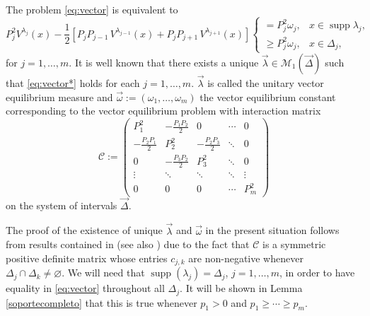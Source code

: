 \documentclass{amsart}
\numberwithin{equation}{section}
\theoremstyle{definition}
\DeclareMathOperator{\supp}{supp}  %
\begin{document}
    The problem \eqref{eq:vector} is equivalent to
    \begin{equation}
    	\label{eq:vector*}
    	P_j^2 V^{\lambda_j}(x) - \frac{1}{2}\left[ P_jP_{j-1}\,V^{\lambda_{j-1}}(x) +  P_jP_{j+1}\,V^{\lambda_{j+1}}(x)\right]
        \begin{cases}
    	    =  P_j^2\omega_j, & x\in\supp \lambda_j,\\
    	  \geq P_j^2\omega_j, & x\in \Delta_j,
        \end{cases}
    \end{equation}
    for $j=1,\ldots,m$. It is well known that there exists a unique $\vec{\lambda} \in \mathcal{M}_1(\vec{\Delta})$ such that \eqref{eq:vector*} holds for each $j=1,\ldots,m$.      $\vec{\lambda}$ is called the unitary vector equilibrium measure and $\vec{\omega} := (\omega_1,\ldots,\omega_m)$ the vector equilibrium constant corresponding to the vector equilibrium problem with interaction matrix
    \begin{equation}
        \label{interaction}
        \mathcal{C} := \left(
        \begin{array}{ccccc}
            P_1^2 & -\frac{P_1 P_2}{2} & 0 & \cdots & 0 \\
            -\frac{P_2 P_1}{2} & P_2^2 & -\frac{P_2 P_3}{2} & \ddots & 0 \\
            0 & -\frac{P_3P_2}{2} & P_3^2  & \ddots & 0 \\
            \vdots & \ddots & \ddots & \ddots & \vdots \\
            0 & 0 & 0 & \cdots & P_m^2
        \end{array} \right)
    \end{equation}
    on the system of intervals $\vec{\Delta}$.

    The proof of the existence of unique $\vec{\lambda}$ and $\vec{\omega}$ in the present situation follows from results contained in \cite[Chap. 5, \S 4]{NS} (see also \cite[Section 4]{bel}) due to the fact that $\mathcal{C}$ is a symmetric positive definite matrix whose entries $c_{j,k}$ are non-negative whenever $\Delta_j \cap \Delta_k \neq \varnothing$. We  will need that $\supp (\lambda_j) = \Delta_j$, $j=1,\ldots,m$, in order to have equality in \eqref{eq:vector} throughout all $\Delta_j$. It will be shown in Lemma \ref{soportecompleto} that this is true whenever $p_1 > 0$ and $p_1 \geq \cdots \geq p_m$.
\end{document}
